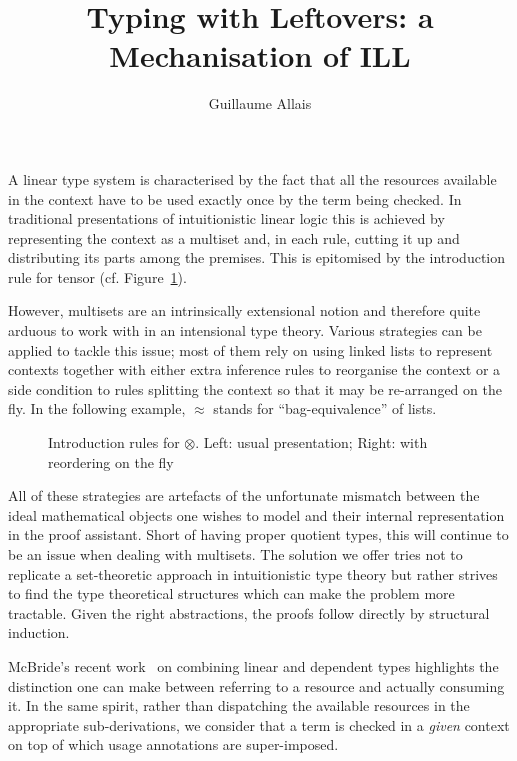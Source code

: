\documentclass[a4paper]{easychair}
\title{Typing with Leftovers: a Mechanisation of ILL}
\author{Guillaume Allais \inst{1}}
\institute{
  Radboud University
  Nijmegen, The Netherlands
  \email{gallais@cs.ru.nl}}
\begin{document}
\maketitle

A linear type system is characterised by the fact that all the
resources available in the context have to be used exactly once
by the term being checked. In traditional presentations of
intuitionistic linear logic this is achieved by representing
the context as a multiset and, in each rule, cutting it up and
distributing its parts among the premises. This is epitomised
by the introduction rule for tensor (cf. Figure~\ref{rule:tensor}).

However, multisets are an intrinsically extensional notion and
therefore quite arduous to work with in an intensional type
theory. Various strategies can be applied to tackle this issue;
most of them rely on using linked lists to represent contexts
together with either extra inference rules to reorganise the
context or a side condition to rules splitting the context so
that it may be re-arranged on the fly. In the following example,
$≈$ stands for ``bag-equivalence'' of lists.

\begin{figure}[ht]
\caption{Introduction rules for $⊗$.
         Left: usual presentation;
         Right: with reordering on the fly\label{rule:tensor}}
\end{figure}

All of these strategies are artefacts of the unfortunate mismatch
between the ideal mathematical objects one wishes to model and
their internal representation in the proof assistant. Short of
having proper quotient types, this will continue to be an issue
when dealing with multisets. The solution we offer tries not to
replicate a set-theoretic approach in intuitionistic type theory
but rather strives to find the type theoretical structures which
can make the problem more tractable. Given the right abstractions,
the proofs follow directly by structural induction.

McBride's recent work~\cite{McBride2016} on combining linear and
dependent types highlights the distinction one can make between
referring to a resource and actually consuming it. In the same spirit,
rather than dispatching the available resources in the appropriate
sub-derivations, we consider that a term is checked in a \emph{given}
context on top of which usage annotations are super-imposed.
\end{document}
